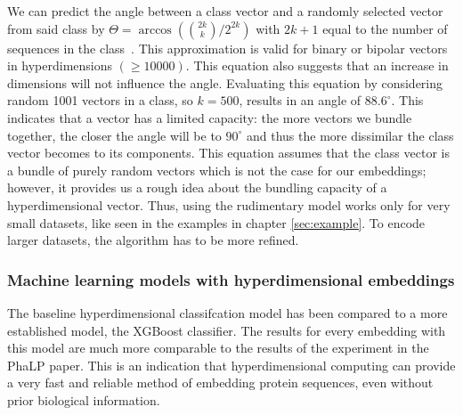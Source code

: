 We can predict the angle between a class vector and a randomly selected vector from said class by $\Theta = \arccos({2k \choose k}/2^{2k})$ with $2k+1$ equal to the number of sequences in the class~\cite{sathdv}. This approximation is valid for binary or bipolar vectors in hyperdimensions $(\ge 10000)$. This equation also suggests that an increase in dimensions will not influence the angle. Evaluating this equation by considering random 1001 vectors in a class, so $k = 500$, results in an angle of $88.6^{\circ}$. This indicates that a vector has a limited capacity: the more vectors we bundle together, the closer the angle will be to $90^{\circ}$ and thus the more dissimilar the class vector becomes to its components. This equation assumes that the class vector is a bundle of purely random vectors which is not the case for our embeddings; however, it provides us a rough idea about the bundling capacity of a hyperdimensional vector. Thus, using the rudimentary model works only for very small datasets, like seen in the examples in chapter \ref{sec:example}. To encode larger datasets, the algorithm has to be more refined.

\subsubsection*{Machine learning models with hyperdimensional embeddings}
The baseline hyperdimensional classifcation model has been compared to a more established model, the XGBoost classifier. The results for every embedding with this model are much more comparable to the results of the experiment in the PhaLP paper. This is an indication that hyperdimensional computing can provide a very fast and reliable method of embedding protein sequences, even without prior biological information.